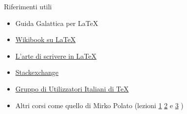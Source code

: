 \begin{frame}{Riferimenti utili}
	\begin{itemize}
		\item Guida Galattica per \LaTeX{}
		\item \href{https://en.wikibooks.org/wiki/LaTeX/}{Wikibook su LaTeX}
		\item \href{http://www.lorenzopantieri.net/LaTeX_files/ArteLaTeX.pdf}
		{L'arte di scrivere in LaTeX}
		\item \href{https://tex.stackexchange.com/}{Stackexchange}
		\item \href{http://www.guitex.org/}
		{Gruppo di Utilizzatori Italiani di TeX}
		\item Altri corsi come quello di Mirko Polato (lezioni
		\href{http://www.math.unipd.it/~mpolato/didattica/latex/lesson_1.pdf}{1}
		\href{http://www.math.unipd.it/~mpolato/didattica/latex/lesson_2.pdf}{2}
		 e 
		\href{http://www.math.unipd.it/~mpolato/didattica/latex/lesson_3.pdf}{3}
		)
	\end{itemize}
\end{frame}